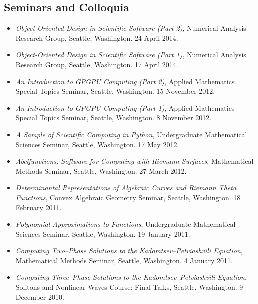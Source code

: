 \documentclass{article}
\begin{document}
\subsection*{Seminars and Colloquia}
\begin{itemize}
  \item {\it Object-Oriented Design in Scientific Software (Part 2)},
    Numerical Analysis Research Group, Seattle, Washington. 24 April
    2014.
  \item {\it Object-Oriented Design in Scientific Software (Part 1)},
    Numerical Analysis Research Group, Seattle, Washington. 17 April
    2014.
  \item {\it An Introduction to GPGPU Computing (Part 2)}, Applied
    Mathematics Special Topics Seminar, Seattle, Washington. 15
    November 2012.
  \item {\it An Introduction to GPGPU Computing (Part 1)}, Applied
    Mathematics Special Topics Seminar, Seattle, Washington. 8
    November 2012.
  \item {\it A Sample of Scientific Computing in Python},
    Undergraduate Mathematical Sciences Seminar, Seattle,
    Washington. 17 May 2012.
  \item {\it Abelfunctions: Software for Computing with Riemann
    Surfaces}, Mathematical Methods Seminar, Seattle, Washington. 27
    March 2012.
  \item {\it Determinantal Representations of Algebraic Curves and
    Riemann Theta Functions}, Convex Algebraic Geometry Seminar,
    Seattle, Washington. 18 February 2011.
  \item {\it Polynomial Approximations to Functions}, Undergraduate
    Mathematical Sciences Seminar, Seattle, Washington. 19 January 2011.
  \item {\it Computing Two--Phase Solutions to the
    Kadomtsev--Petviashvili Equation}, Mathematical Methods Seminar,
    Seattle, Washington. 4 January 2011.
  \item {\it Computing Three--Phase Solutions to the
    Kadomtsev--Petviashvili Equation}, Solitons and Nonlinear Waves
    Course: Final Talks, Seattle, Washington. 9 December 2010.
\end{itemize}
\end{document}
